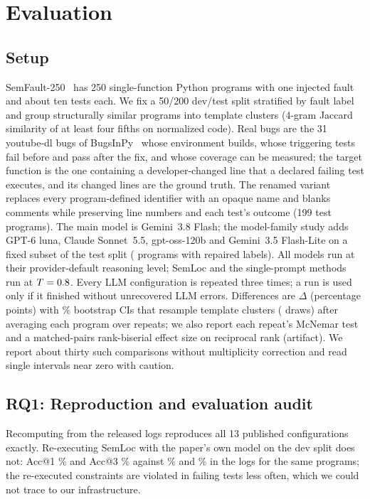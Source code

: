 \section{Evaluation}
\label{sec:eval}

\subsection{Setup}
SemFault-250~\cite{yang2026semloc} has 250 single-function Python programs with one injected fault and about ten tests
each. We fix a 50/200 dev/test split stratified by fault label and group structurally similar programs into template
clusters (4-gram Jaccard similarity of at least four fifths on normalized code). Real bugs are the 31 youtube-dl bugs of
BugsInPy~\cite{widyasari2020} whose environment builds, whose triggering tests fail before and pass after the fix, and
whose coverage can be measured; the target function is the one containing a developer-changed line that a declared
failing test executes, and its changed lines are the ground truth. The renamed variant replaces every program-defined
identifier with an opaque name and blanks comments while preserving line numbers and each test's outcome (199 test
programs). The main model is Gemini~3.8 Flash; the model-family study adds GPT-6 luna, Claude Sonnet~5.5, gpt-oss-120b
and Gemini~3.5 Flash-Lite on a fixed subset of the test split (\ParetoSemlocGeminiThreeEightFlashN{} programs with
repaired labels). All models run at their provider-default reasoning level; SemLoc and the single-prompt methods run at
$T=0.8$. Every LLM configuration is repeated three times; a run is used only if it finished without
unrecovered LLM errors. Differences are $\Delta$ (percentage points) with \ConstCiLevel\% bootstrap CIs that resample
template clusters (\ConstBootstrapDraws{} draws) after averaging each program over repeats; we also report each repeat's
McNemar test and a matched-pairs rank-biserial effect size on reciprocal rank (artifact). We report about
thirty such comparisons without multiplicity correction and read single intervals near zero with caution.

\subsection{RQ1: Reproduction and evaluation audit}
Recomputing from the released logs reproduces all 13 published configurations exactly. Re-executing SemLoc with the
paper's own model on the dev split does not: Acc@1 \RepClaudeDevRerunAccOne\% and Acc@3 \RepClaudeDevRerunAccThree\%
against \RepClaudeDevPublishedAccOne\% and \RepClaudeDevPublishedAccThree\% in the logs for the same programs; the
re-executed constraints are violated in failing tests less often, which we could not trace to our infrastructure.

